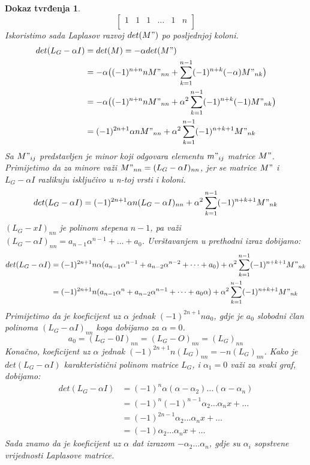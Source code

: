 \documentclass[11pt]{article}
\newtheorem*{custom_proof}{Dokaz tvrđenja}
\begin{document}
\begin{custom_proof}
\[\begin{bmatrix}
				1 & 1 & 1 & \dots & 1 & n \\
				\end{bmatrix}
		\]
		Iskoristimo sada Laplasov razvoj $det(M")$ po posljednjoj koloni.
		\[ 
		\begin{split}
			det(L_G - \alpha I) & = det(M) = -\alpha det(M") \\
			                    & = -\alpha \big( (-1)^{n+n}nM"_{nn} + \sum_{k=1}^{n-1}(-1)^{n+k}(-\alpha) M"_{nk} \big)  \\
			                    & = -\alpha \big( (-1)^{n+n}nM"_{nn} + \alpha^2 \sum_{k=1}^{n-1}(-1)^{n+k}(-1)M"_{nk} \big) \\
					     	    & = (-1)^{2n+1} \alpha nM"_{nn} + \alpha^2 \sum_{k=1}^{n-1}(-1)^{n+k+1}M"_{nk}
		\end{split}
		\]
		Sa $M"_{ij}$ predstavljen je minor koji odgovara elementu $m"_{ij}$ matrice $M"$.
		Primijetimo da za minore važi $M"_{nn} = (L_G - \alpha I)_{nn}$, jer se matrice  $M"$ i $L_G - \alpha I$ razlikuju isključivo u n-toj vrsti i koloni.
		\[
		det(L_G - \alpha I) = (-1)^{2n+1} \alpha n (L_G- \alpha I)_{nn} + \alpha^2 \sum_{k=1}^{n-1}(-1)^{n+k+1}M"_{nk}
		\]
		$(L_G- xI)_{nn}$ je polinom stepena $n-1$, pa važi $(L_G- \alpha I)_{nn} = a_{n-1}\alpha^{n-1} + \dots + a_0$.
		Uvrštavanjem u prethodni izraz dobijamo:
		\[
			\begin{split}
				det(L_G - \alpha I) &= (-1)^{2n+1} n \alpha (a_{n-1}\alpha^{n-1} + a_{n-2}\alpha^{n-2} + \dots + a_0) + \alpha^2 \sum_{k=1}^{n-1}(-1)^{n+k+1}M"_{nk} \\
									&= (-1)^{2n+1} n (a_{n-1}\alpha^n + a_{n-2}\alpha^{n-1} + \dots + a_0 \alpha) + \alpha^2 \sum_{k=1}^{n-1}(-1)^{n+k+1}M"_{nk}
			\end{split}
		\]
		Primijetimo da je koeficijent uz $\alpha$ jednak $(-1)^{2n+1} n a_0$, gdje je $a_0$ slobodni član polinoma $(L_G- \alpha I)_{nn}$ koga dobijamo za $\alpha=0$.
		\[
		  a_0 = (L_G- 0I)_{nn} = (L_G- O)_{nn} = (L_G)_{nn}
		\]
		Konačno, koeficijent uz $\alpha$ jednak $ (-1)^{2n+1} n (L_G)_{nn} = - n (L_G)_{nn}$.
		Kako je $det(L_G - \alpha I)$ karakteristični polinom matrice $L_G$, i $\alpha_1 = 0$ važi za svaki graf, dobijamo:
		\[
			\begin{split}
				det(L_G - \alpha I)  & = (-1)^n \alpha (\alpha - \alpha_2) \dots (\alpha - \alpha_n) \\
									 & = (-1)^n(-1)^{n-1} \alpha_2 \dots \alpha_n x + \dots \\
									 & = (-1)^{2n-1} \alpha_2 \dots \alpha_n x + \dots \\
								     & = (-1) \alpha_2 \dots \alpha_n x + \dots 
									\end{split}
									\]
		Sada znamo da je koeficijent uz $\alpha$ dat izrazom $- \alpha_2 \dots \alpha_n$, gdje su $\alpha_i$ sopstvene vrijednosti Laplasove matrice. 
	

\end{custom_proof}
\end{document}
